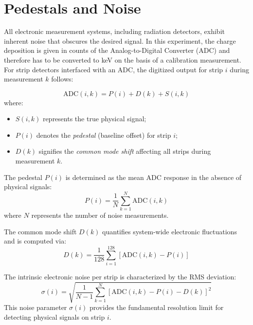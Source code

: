 \section{Pedestals and Noise}

All electronic measurement systems, including radiation detectors, exhibit inherent noise that obscures the desired signal. In this experiment, the charge deposition is given in counts of the Analog-to-Digital Converter (ADC) and therefore has to be converted to keV on the basis of a calibration measurement. For strip detectors interfaced with an ADC, the digitized output for strip $i$ during measurement $k$ follows:

\begin{equation}
\text{ADC}(i,k) = P(i) + D(k) + S(i,k)
\end{equation}
where:
\begin{itemize}
    \item $S(i,k)$ represents the true physical signal;
    \item $P(i)$ denotes the \textit{pedestal} (baseline offset) for strip $i$;
    \item $D(k)$ signifies the \textit{common mode shift} affecting all strips during measurement $k$.
\end{itemize}

The pedestal $P(i)$ is determined as the mean ADC response in the absence of physical signals:
\begin{equation}
P(i) = \frac{1}{N} \sum_{k=1}^{N} \text{ADC}(i,k) \label{eq:pedestal}
\end{equation}
where $N$ represents the number of noise measurements.

The common mode shift $D(k)$ quantifies system-wide electronic fluctuations and is computed via:
\begin{equation}
D(k) = \frac{1}{128} \sum_{i=1}^{128} \left[ \text{ADC}(i,k) - P(i) \right] \label{eq:shift}
\end{equation}

The intrinsic electronic noise per strip is characterized by the RMS deviation:
\begin{equation}
\sigma(i) = \sqrt{ \frac{1}{N-1} \sum_{k=1}^{N} \left[ \text{ADC}(i,k) - P(i) - D(k) \right]^2 } \label{eq:noise}
\end{equation}
This noise parameter $\sigma(i)$ provides the fundamental resolution limit for detecting physical signals on strip $i$.
